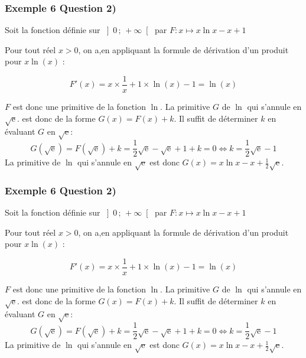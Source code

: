 \documentclass[11pt, hyperref={urlcolor=red,%
            linkcolor=blue, %
            colorlinks=true}]{beamer}
\newcommand{\Interoo}[2]{\left]#1\, ;\, #2\right[}
\begin{document}
\begin{frame}
\frametitle{Exemple 6 Question 2)}


Soit la fonction définie sur $\Interoo{0}{+\infty}$ par $F: x \mapsto x \ln x - x +1 $


Pour tout réel $x>0$, on a,en appliquant la formule de dérivation d'un produit pour $x \ln(x)$ : 

\begin{equation*}
F'(x)=x \times \frac{1}{x} + 1 \times \ln(x) -1=\ln(x)
\end{equation*}

$F$ est donc une primitive de la fonction $\ln$. La primitive $G$ de $\ln$ qui s'annule en $\sqrt{\text{e}}$. est donc de la forme $G(x)=F(x)+k$. Il suffit de déterminer $k$ en évaluant $G$ en $\sqrt{\text{e}}$: 
$$G(\sqrt{\text{e}})=F(\sqrt{\text{e}})+k= \frac{1}{2}\sqrt{\text{e}}-\sqrt{\text{e}}+1+k=0 \Leftrightarrow k = \frac{1}{2}\sqrt{\text{e}}-1$$
La primitive de $\ln$ qui s'annule en $\sqrt{\text{e}}$ est donc $G(x)=x \ln x - x +\frac{1}{2}\sqrt{\text{e}}$.
\end{frame}

\begin{frame}
\frametitle{Exemple 6 Question 2)}

Soit la fonction définie sur $\Interoo{0}{+\infty}$ par $F: x \mapsto x \ln x - x +1 $


Pour tout réel $x>0$, on a,en appliquant la formule de dérivation d'un produit pour $x \ln(x)$ : 

\begin{equation*}
F'(x)=x \times \frac{1}{x} + 1 \times \ln(x) -1=\ln(x)
\end{equation*}

$F$ est donc une primitive de la fonction $\ln$. La primitive $G$ de $\ln$ qui s'annule en $\sqrt{\text{e}}$. est donc de la forme $G(x)=F(x)+k$. Il suffit de déterminer $k$ en évaluant $G$ en $\sqrt{\text{e}}$: 
$$G(\sqrt{\text{e}})=F(\sqrt{\text{e}})+k= \frac{1}{2}\sqrt{\text{e}}-\sqrt{\text{e}}+1+k=0 \Leftrightarrow k = \frac{1}{2}\sqrt{\text{e}}-1$$
La primitive de $\ln$ qui s'annule en $\sqrt{\text{e}}$ est donc $G(x)=x \ln x - x +\frac{1}{2}\sqrt{\text{e}}$.
\end{frame}
\end{document}
